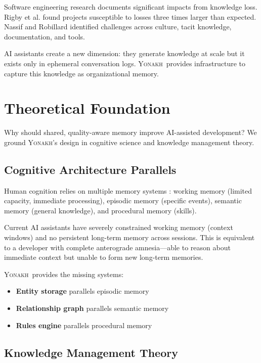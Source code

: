 \documentclass[10pt,journal,compsoc]{IEEEtran}
\newcommand{\yonakh}{\textsc{Yonakh}}
\begin{document}
Software engineering research documents significant impacts from knowledge loss. Rigby et al. \cite{rigby2016quantifying} found projects susceptible to losses three times larger than expected. Nassif and Robillard \cite{nassif2021turnover} identified challenges across culture, tacit knowledge, documentation, and tools.

AI assistants create a new dimension: they generate knowledge at scale but it exists only in ephemeral conversation logs. \yonakh\ provides infrastructure to capture this knowledge as organizational memory.

\section{Theoretical Foundation}

Why should shared, quality-aware memory improve AI-assisted development? We ground \yonakh's design in cognitive science and knowledge management theory.

\subsection{Cognitive Architecture Parallels}

Human cognition relies on multiple memory systems \cite{baddeley2012working,tulving1985memory}: working memory (limited capacity, immediate processing), episodic memory (specific events), semantic memory (general knowledge), and procedural memory (skills).

Current AI assistants have severely constrained working memory (context windows) and no persistent long-term memory across sessions. This is equivalent to a developer with complete anterograde amnesia---able to reason about immediate context but unable to form new long-term memories.

\yonakh\ provides the missing systems:
\begin{itemize}
\item \textbf{Entity storage} parallels episodic memory
\item \textbf{Relationship graph} parallels semantic memory
\item \textbf{Rules engine} parallels procedural memory
\end{itemize}

\subsection{Knowledge Management Theory}
\end{document}
